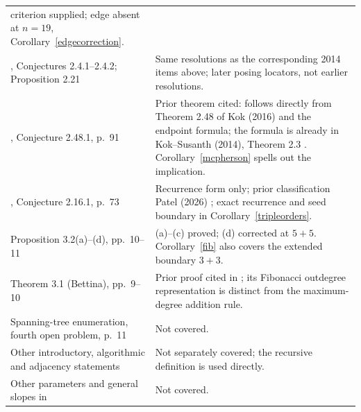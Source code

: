 \documentclass[11pt]{article}
\begin{document}
\begin{longtable}{@{}>{\raggedright\arraybackslash}p{.35\linewidth}>{\raggedright\arraybackslash}p{.60\linewidth}@{}}
criterion supplied; edge absent at $n=19$, Corollary~\ref{edgecorrection}.\\
\cite{critical}, Conjectures 2.4.1--2.4.2; Proposition 2.21 &
Same resolutions as the corresponding 2014 items above; later
posing locators, not earlier resolutions.\\
\cite{critical}, Conjecture 2.48.1, p.~91 & Prior theorem cited:
follows directly from Theorem 2.48 of Kok (2016) and the endpoint formula;
the formula is already in Kok--Susanth (2014), Theorem 2.3
\cite{mcphersonprior}. Corollary~\ref{mcpherson} spells out the implication.\\
\cite{critical}, Conjecture 2.16.1, p.~73 & Recurrence form only;
prior classification Patel (2026) \cite{patelsets};
exact recurrence and seed boundary in
Corollary~\ref{tripleorders}.\\
Proposition 3.2(a)--(d), pp.~10--11 & (a)--(c) proved; (d) corrected
at $5+5$. Corollary~\ref{fib} also covers the extended boundary $3+3$.\\
Theorem 3.1 (Bettina), pp.~9--10 & Prior proof cited in
\cite{original}; its Fibonacci outdegree representation is distinct
from the maximum-degree addition rule.\\
Spanning-tree enumeration, fourth open problem, p.~11 & Not covered.\\
Other introductory, algorithmic and adjacency statements & Not
separately covered; the recursive definition is used directly.\\
Other parameters and general slopes in \cite{critical} & Not covered.\\
\bottomrule
\end{longtable}
\endgroup
\end{document}
